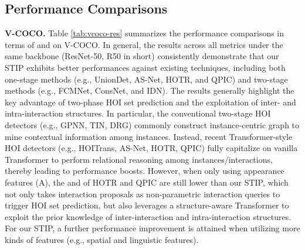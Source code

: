 \documentclass[10pt,twocolumn,letterpaper]{article}
\begin{document}
\subsection{Performance Comparisons}
\textbf{V-COCO.} Table \ref{tab:vcoco-res} summarizes the performance comparisons in terms of  and  on V-COCO. In general, the results across all metrics under the same backbone (ResNet-50, R50 in short) consistently demonstrate that our STIP exhibits better performances against existing techniques, including both one-stage methods (e.g., UnionDet, AS-Net, HOTR, and QPIC) and two-stage methods (e.g., FCMNet, ConsNet, and IDN). The results generally highlight the key advantage of two-phase HOI set prediction and the exploitation of inter- and intra-interaction structures. In particular, the conventional two-stage HOI detectors (e.g., GPNN, TIN, DRG) commonly construct instance-centric graph to mine contextual information among instances. Instead, recent Transformer-style HOI detectors (e.g., HOITrans, AS-Net, HOTR, QPIC) fully capitalize on vanilla Transformer to perform relational reasoning among instances/interactions, thereby leading to performance boosts. However, when only using appearance features (A), the  and  of HOTR and QPIC are still lower than our STIP, which not only takes interaction proposals as non-parametric interaction queries to trigger HOI set prediction, but also leverages a structure-aware Transformer to exploit the prior knowledge of inter-interaction and intra-interaction structures. For our STIP, a further performance improvement is attained when utilizing more kinds of features (e.g., spatial and linguistic features).
\end{document}
